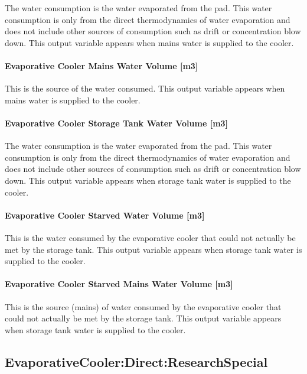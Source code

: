 The water consumption is the water evaporated from the pad. This water consumption is only from the direct thermodynamics of water evaporation and does not include other sources of consumption such as drift or concentration blow down. This output variable appears when mains water is supplied to the cooler.

\paragraph{Evaporative Cooler Mains Water Volume {[}m3{]}}\label{evaporative-cooler-mains-water-volume-m3}

This is the source of the water consumed. This output variable appears when mains water is supplied to the cooler.

\paragraph{Evaporative Cooler Storage Tank Water Volume {[}m3{]}}\label{evaporative-cooler-storage-tank-water-volume-m3}

The water consumption is the water evaporated from the pad. This water consumption is only from the direct thermodynamics of water evaporation and does not include other sources of consumption such as drift or concentration blow down. This output variable appears when storage tank water is supplied to the cooler.

\paragraph{Evaporative Cooler Starved Water Volume {[}m3{]}}\label{evaporative-cooler-starved-water-volume-m3}

This is the water consumed by the evaporative cooler that could not actually be met by the storage tank. This output variable appears when storage tank water is supplied to the cooler.

\paragraph{Evaporative Cooler Starved Mains Water Volume {[}m3{]}}\label{evaporative-cooler-starved-mains-water-volume-m3}

This is the source (mains) of water consumed by the evaporative cooler that could not actually be met by the storage tank. This output variable appears when storage tank water is supplied to the cooler.

\subsection{EvaporativeCooler:Direct:ResearchSpecial}\label{evaporativecoolerdirectresearchspecial}

